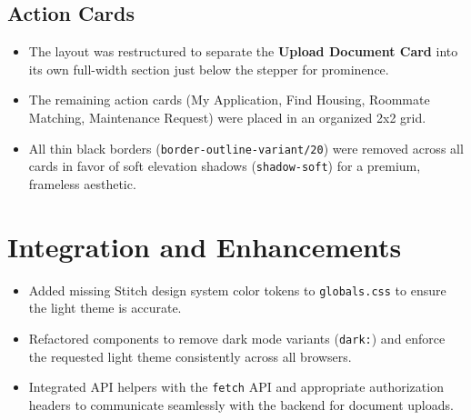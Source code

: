 \documentclass[12pt,a4paper]{article}
\begin{document}
\subsection{Action Cards}
\begin{itemize}[noitemsep]
    \item The layout was restructured to separate the \textbf{Upload Document Card} into its own full-width section just below the stepper for prominence.
    \item The remaining action cards (My Application, Find Housing, Roommate Matching, Maintenance Request) were placed in an organized 2x2 grid.
    \item All thin black borders (\texttt{border-outline-variant/20}) were removed across all cards in favor of soft elevation shadows (\texttt{shadow-soft}) for a premium, frameless aesthetic.
\end{itemize}

\section{Integration and Enhancements}
\begin{itemize}[noitemsep]
    \item Added missing Stitch design system color tokens to \texttt{globals.css} to ensure the light theme is accurate.
    \item Refactored components to remove dark mode variants (\texttt{dark:}) and enforce the requested light theme consistently across all browsers.
    \item Integrated API helpers with the \texttt{fetch} API and appropriate authorization headers to communicate seamlessly with the backend for document uploads.
\end{itemize}
\end{document}
